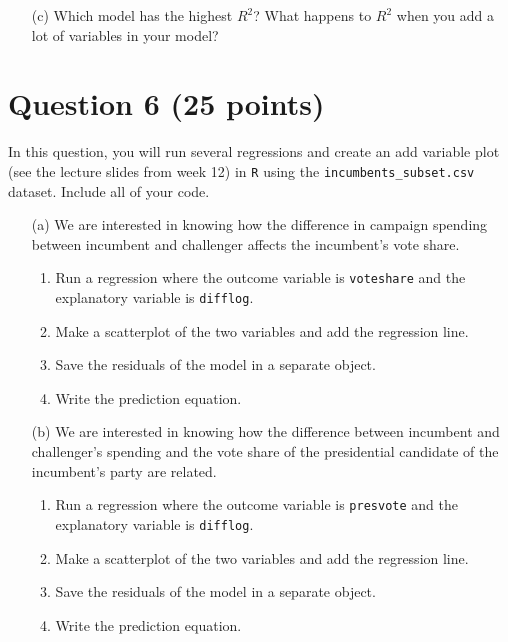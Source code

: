 \documentclass[12pt,letterpaper]{article}
\begin{document}
\begin{enumerate}
	\vspace{1cm}
\item  [(c)] Which model has the highest $R^2$? What happens to $R^2$ when you add a lot of variables in your model?
\end{enumerate}

\newpage		
\section*{Question 6 (25 points)}
In this question, you will run several regressions and create an add variable plot (see the lecture slides from week 12) in \texttt{R} using the \texttt{incumbents\_subset.csv} dataset. Include all of your code.

\begin{enumerate}
\item  [(a)] We are interested in knowing how the difference in campaign spending between incumbent and challenger affects the incumbent's vote share. 
	\begin{enumerate}
		\item Run a regression where the outcome variable is \texttt{voteshare} and the explanatory variable is \texttt{difflog}.
		
		\item Make a scatterplot of the two variables and add the regression line. 
		\item Save the residuals of the model in a separate object.
		\item Write the prediction equation.
	\end{enumerate}
	
	
	\vspace{5cm}
	
\item [(b)] We are interested in knowing how the difference between incumbent and challenger's spending and the vote share of the presidential candidate of the incumbent's party are related.
	\begin{enumerate}
		\item Run a regression where the outcome variable is \texttt{presvote} and the explanatory variable is \texttt{difflog}.
		\item Make a scatterplot of the two variables and add the regression line. 
		\item Save the residuals of the model in a separate object.
		\item Write the prediction equation.
	\end{enumerate}


\end{enumerate}
\end{document}
